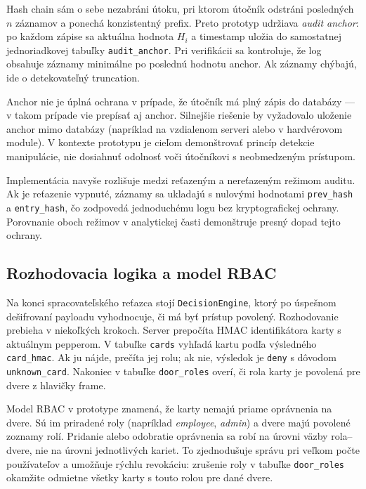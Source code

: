 \documentclass[journal,a4paper,onecolumn]{IEEEtran}
\begin{document}
Hash chain sám o sebe nezabráni útoku, pri ktorom útočník odstráni posledných $n$ záznamov a ponechá konzistentný prefix. Preto prototyp udržiava \emph{audit anchor}: po každom zápise sa aktuálna hodnota $H_i$ a timestamp uložia do samostatnej jednoriadkovej tabuľky \texttt{audit\_anchor}. Pri verifikácii sa kontroluje, že log obsahuje záznamy minimálne po poslednú hodnotu anchor. Ak záznamy chýbajú, ide o detekovateľný truncation\cite{SchneierKelsey1999,NIST80092}.

Anchor nie je úplná ochrana v prípade, že útočník má plný zápis do databázy --- v takom prípade vie prepísať aj anchor. Silnejšie riešenie by vyžadovalo uloženie anchor mimo databázy (napríklad na vzdialenom serveri alebo v hardvérovom module). V kontexte prototypu je cieľom demonštrovať princíp detekcie manipulácie, nie dosiahnuť odolnosť voči útočníkovi s neobmedzeným prístupom.

Implementácia navyše rozlišuje medzi reťazeným a nereťazeným režimom auditu. Ak je reťazenie vypnuté, záznamy sa ukladajú s nulovými hodnotami \texttt{prev\_hash} a \texttt{entry\_hash}, čo zodpovedá jednoduchému logu bez kryptografickej ochrany. Porovnanie oboch režimov v analytickej časti demonštruje presný dopad tejto ochrany.

\subsection{Rozhodovacia logika a model RBAC}

Na konci spracovateľského reťazca stojí \texttt{DecisionEngine}, ktorý po úspešnom dešifrovaní payloadu vyhodnocuje, či má byť prístup povolený. Rozhodovanie prebieha v niekoľkých krokoch. Server prepočíta HMAC identifikátora karty s aktuálnym pepperom. V tabuľke \texttt{cards} vyhľadá kartu podľa výsledného \texttt{card\_hmac}. Ak ju nájde, prečíta jej rolu; ak nie, výsledok je \texttt{deny} s dôvodom \texttt{unknown\_card}. Nakoniec v tabuľke \texttt{door\_roles} overí, či rola karty je povolená pre dvere z hlavičky frame\cite{NISTRBACModel,SandhuRBAC1996}.

Model RBAC v prototype znamená, že karty nemajú priame oprávnenia na dvere. Sú im priradené roly (napríklad \emph{employee}, \emph{admin}) a dvere majú povolené zoznamy rolí. Pridanie alebo odobratie oprávnenia sa robí na úrovni väzby rola--dvere, nie na úrovni jednotlivých kariet. To zjednodušuje správu pri veľkom počte používateľov a umožňuje rýchlu revokáciu: zrušenie roly v tabuľke \texttt{door\_roles} okamžite odmietne všetky karty s touto rolou pre dané dvere.
\end{document}
